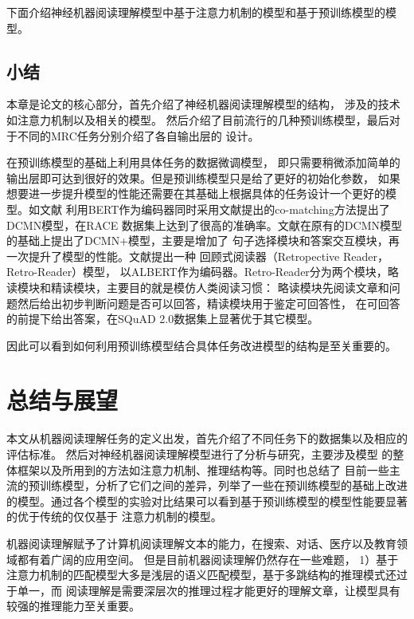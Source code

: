 \documentclass{article}
\newcommand{\upcite}[1]{\textsuperscript{\textsuperscript{\cite{#1}}}}
\begin{document}
\begin{multicols}{2}
下面介绍神经机器阅读理解模型中基于注意力机制的模型和基于预训练模型的模型。
%




% 


% 


% 
\subsection{小结}
本章是论文的核心部分，首先介绍了神经机器阅读理解模型的结构，
涉及的技术如注意力机制以及相关的模型。
然后介绍了目前流行的几种预训练模型，最后对于不同的MRC任务分别介绍了各自输出层的
设计。

在预训练模型的基础上利用具体任务的数据微调模型，
即只需要稍微添加简单的输出层即可达到很好的效果。但是预训练模型只是给了更好的初始化参数，
如果想要进一步提升模型的性能还需要在其基础上根据具体的任务设计一个更好的模型。如文献\cite{DCMN}
利用BERT作为编码器同时采用文献\cite{Co-matching}提出的co-matching方法提出了DCMN模型，在RACE\upcite{RACE}
数据集上达到了很高的准确率。文献\cite{DCMN+}在原有的DCMN模型的基础上提出了DCMN+模型，主要是增加了
句子选择模块和答案交互模块，再一次提升了模型的性能。文献\cite{Retrospective}提出一种
回顾式阅读器（Retropective Reader，Retro-Reader）模型，
以ALBERT作为编码器。Retro-Reader分为两个模块，略读模块和精读模块，主要目的就是模仿人类阅读习惯：
略读模块先阅读文章和问题然后给出初步判断问题是否可以回答，精读模块用于鉴定可回答性，
在可回答的前提下给出答案，在SQuAD 2.0\upcite{SQuAD2}数据集上显著优于其它模型。

因此可以看到如何利用预训练模型结合具体任务改进模型的结构是至关重要的。





\section{总结与展望}
本文从机器阅读理解任务的定义出发，首先介绍了不同任务下的数据集以及相应的评估标准。
然后对神经机器阅读理解模型进行了分析与研究，主要涉及模型
的整体框架以及所用到的方法如注意力机制、推理结构等。同时也总结了
目前一些主流的预训练模型，分析了它们之间的差异，列举了一些在预训练模型的基础上改进
的模型。通过各个模型的实验对比结果可以看到基于预训练模型的模型性能要显著的优于传统的仅仅基于
注意力机制的模型。

机器阅读理解赋予了计算机阅读理解文本的能力，在搜索、对话、医疗以及教育领域都有着广阔的应用空间。
但是目前机器阅读理解仍然存在一些难题，
1）基于注意力机制的匹配模型大多是浅层的语义匹配模型，基于多跳结构的推理模式还过于单一，而
阅读理解是需要深层次的推理过程才能更好的理解文章，让模型具有较强的推理能力至关重要。


\end{multicols}
\end{document}
